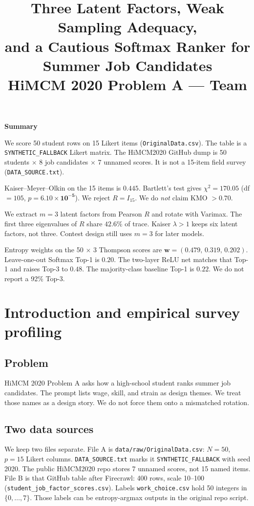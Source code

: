 \documentclass[12pt]{article}
\title{\textbf{Three Latent Factors, Weak Sampling Adequacy,\\
and a Cautious Softmax Ranker for Summer Job Candidates}\\[0.4em]
\large HiMCM 2020 Problem A --- Team \TeamNumber}
\author{}
\date{}
\begin{document}
\maketitle
\thispagestyle{empty}

\begin{center}
{\Large \textbf{Summary}}
\end{center}

\noindent
We score 50 student rows on 15 Likert items
(\texttt{OriginalData.csv}).
The table is a \texttt{SYNTHETIC\_FALLBACK} Likert matrix.
The HiMCM2020 GitHub dump is 50 students $\times$ 8 job candidates $\times$ 7 unnamed scores.
It is not a 15-item field survey
(\texttt{DATA\_SOURCE.txt}).

Kaiser--Meyer--Olkin on the 15 items is \(\mathbf{0.445}\).
Bartlett's test gives \(\chi^2=\mathbf{170.05}\) (df \(=105\), \(p=\mathbf{6.10\times 10^{-5}}\)).
We reject \(R=I_{15}\).
We do \emph{not} claim KMO \(>0.70\).

We extract \(m=3\) latent factors from Pearson \(R\) and rotate with Varimax.
The first three eigenvalues of \(R\) share \(\mathbf{42.6\%}\) of trace.
Kaiser \(\lambda>1\) keeps six latent factors, not three.
Contest design still uses \(m=3\) for later models.

Entropy weights on the 50 \(\times\) 3 Thompson scores are
\(\mathbf{w}=(0.479,\,0.319,\,0.202)\).
Leave-one-out Softmax Top-1 is \(\mathbf{0.20}\).
The two-layer ReLU net matches that Top-1 and raises Top-3 to \(\mathbf{0.48}\).
The majority-class baseline Top-1 is \(\mathbf{0.22}\).
We do not report a 92\% Top-3.

\tableofcontents
\newpage

\section{Introduction and empirical survey profiling}

\subsection{Problem}
HiMCM 2020 Problem A asks how a high-school student ranks summer job candidates.
The prompt lists wage, skill, and strain as design themes.
We treat those names as a design story.
We do not force them onto a mismatched rotation.

\subsection{Two data sources}
We keep two files separate.
File A is \texttt{data/raw/OriginalData.csv}: \(N=50\), \(p=15\) Likert columns.
\texttt{DATA\_SOURCE.txt} marks it \texttt{SYNTHETIC\_FALLBACK} with seed 2020.
The public HiMCM2020 repo stores 7 unnamed scores, not 15 named items.
File B is that GitHub table after Firecrawl: 400 rows, scale 10--100
(\texttt{student\_job\_factor\_scores.csv}).
Labels \texttt{work\_choice.csv} hold 50 integers in \(\{0,\ldots,7\}\).
Those labels can be entropy-argmax outputs in the original repo script.
\end{document}
